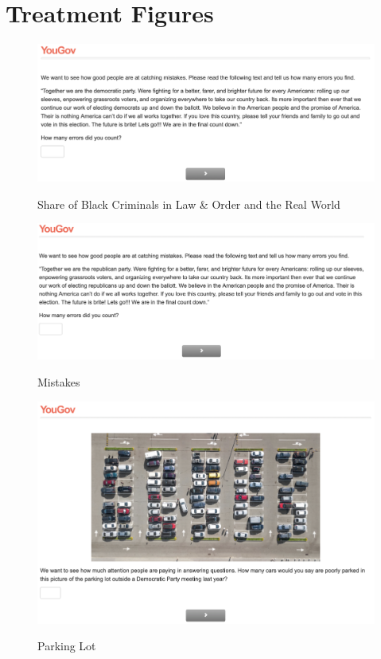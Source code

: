 \documentclass[12pt, letterpaper]{article}
\begin{document}
\section{Treatment Figures}
\begin{figure}[!htbp]
\centering
\caption{Share of Black Criminals in Law \& Order and the Real World}
\includegraphics[scale=.4]{../data/treats/Mistakes_Dem.png}
\label{fig:mistakes_dem}
\end{figure}

\begin{figure}[!htbp]
\centering
\caption{Mistakes}
\includegraphics[scale=.4]{../data/treats/Mistakes_Rep.png}
\label{fig:mistakes_rep}
\end{figure}

\begin{figure}[!htbp]
\centering
\caption{Parking Lot}
\includegraphics[scale=.4]{../data/treats/Parking_Lot_Dems.png}
\label{fig:mistakes_rep}
\end{figure}
\end{document}
